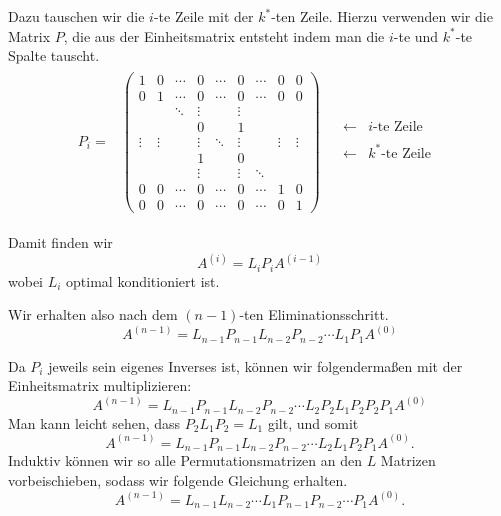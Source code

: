 \documentclass[smallheadings]{scrartcl}
\theoremstyle{definition}
\begin{document}
	Dazu tauschen wir die $i$-te Zeile mit der $k^*$-ten Zeile.
	Hierzu verwenden wir die Matrix $P$, die aus der Einheitsmatrix entsteht indem man die $i$-te und $k^*$-te Spalte tauscht.
	$$P_i=\begin{array}{cc}
	\begin{array}{c}
	\begin{pmatrix}	
	1&0&\cdots&0&\cdots&0&\cdots&0&0\\
	0&1&\cdots&0&\cdots&0&\cdots&0&0\\
	&&\ddots&\vdots&&\vdots&&&\\
	&&&0&&1&&&\\
	\vdots&\vdots&&\vdots&\ddots&\vdots&&\vdots&\vdots\\
	&&&1&&0&&&\\
	&&&\vdots&&\vdots&\ddots&&\\
	0&0&\cdots&0&\cdots&0&\cdots&1&0\\
	0&0&\cdots&0&\cdots&0&\cdots&0&1
	\end{pmatrix}
	\end{array}&\begin{array}{cc}
	&\\
	&\\
	&\\
	\leftarrow&i\text{-te Zeile}\\
	\\
	\leftarrow&k^*\text{-te Zeile}\\
	&\\
	&\\
	&\\
	\end{array}
	\end{array}	
	$$	
	
	Damit finden wir $$A^{(i)}=L_iP_iA^{(i-1)}$$ wobei $L_i$ optimal konditioniert ist.
	
	Wir erhalten also nach dem $(n-1)$-ten Eliminationsschritt.
	$$A^{(n-1)}=L_{n-1}P_{n-1}L_{n-2}P_{n-2}\cdots L_{1}P_{1}A^{(0)}$$

	Da $P_i$ jeweils sein eigenes Inverses ist, können wir folgendermaßen mit der Einheitsmatrix multiplizieren:
	$$A^{(n-1)}=L_{n-1}P_{n-1}L_{n-2}P_{n-2}\cdots L_{2}P_{2}L_{1}P_{2}P_{2}P_{1}A^{(0)}$$
	Man kann leicht sehen, dass $P_{2}L_{1}P_{2}=L_{1}$ gilt, und somit 
$$A^{(n-1)}=L_{n-1}P_{n-1}L_{n-2}P_{n-2}\cdots L_{2}L_{1}P_{2}P_{1}A^{(0)}.$$
Induktiv können wir so alle Permutationsmatrizen an den $L$ Matrizen vorbeischieben, sodass wir folgende Gleichung erhalten.
$$A^{(n-1)}=L_{n-1}L_{n-2}\cdots L_{1}P_{n-1}P_{n-2}\cdots P_{1}A^{(0)}.$$
\end{document}
